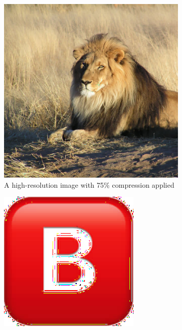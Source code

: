 \documentclass[12pt,technote]{IEEEtran}
\begin{document}
\begin{figure}[h]
    \centering
    \begin{subfigure}[m]{0.3\textwidth}
        \centering
        \includegraphics[width=\textwidth]{figures/lion_compressed.jpg}
        \caption{A high-resolution image with 75\% compression applied}
        \label{fig:lion}
    \end{subfigure}
    \hfill
    \begin{subfigure}[b]{0.3\textwidth}
        \centering
        \includegraphics[width=\textwidth]{figures/b_compressed.jpg}

\end{subfigure}
\end{figure}
\end{document}
